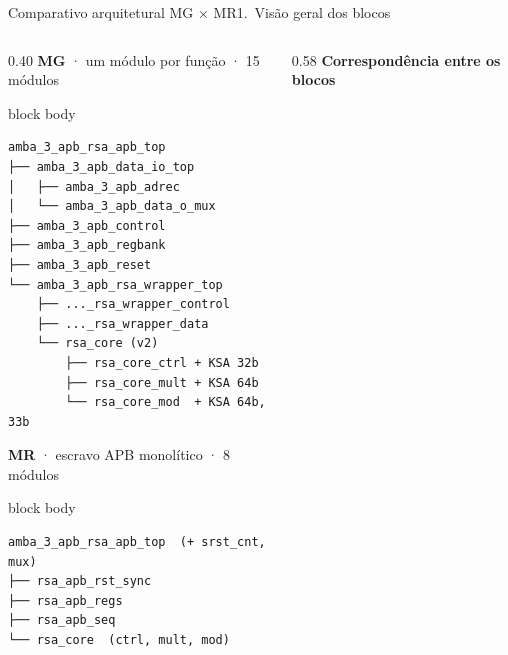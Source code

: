 \documentclass[aspectratio=169,10pt,t]{beamer}
\begin{document}
\begin{frame}[fragile]{Comparativo arquitetural MG × MR}{1.~Visão geral dos blocos}
  \vspace*{-0.35cm}
  \begin{columns}[T]
    \begin{column}{0.40\textwidth}
      {\scriptsize\textbf{\color{tmCafe}MG} · um módulo por função · 15 módulos}\\[0.05cm]
      \begin{beamercolorbox}[rounded=true,shadow=false,sep=3pt]{block body}
\vspace*{-0.6\baselineskip}
\fontsize{4.9}{5.7}\selectfont
\begin{verbatim}
amba_3_apb_rsa_apb_top
├── amba_3_apb_data_io_top
│   ├── amba_3_apb_adrec
│   └── amba_3_apb_data_o_mux
├── amba_3_apb_control
├── amba_3_apb_regbank
├── amba_3_apb_reset
└── amba_3_apb_rsa_wrapper_top
    ├── ..._rsa_wrapper_control
    ├── ..._rsa_wrapper_data
    └── rsa_core (v2)
        ├── rsa_core_ctrl + KSA 32b
        ├── rsa_core_mult + KSA 64b
        └── rsa_core_mod  + KSA 64b, 33b
\end{verbatim}
\vspace*{-0.6\baselineskip}
      \end{beamercolorbox}
      \vspace{0.1cm}
      {\scriptsize\textbf{\color{tmCafe}MR} · escravo APB monolítico · 8 módulos}\\[0.05cm]
      \begin{beamercolorbox}[rounded=true,shadow=false,sep=3pt]{block body}
\vspace*{-0.6\baselineskip}
\fontsize{4.9}{5.7}\selectfont
\begin{verbatim}
amba_3_apb_rsa_apb_top  (+ srst_cnt, mux)
├── rsa_apb_rst_sync
├── rsa_apb_regs
├── rsa_apb_seq
└── rsa_core  (ctrl, mult, mod)
\end{verbatim}
\vspace*{-0.6\baselineskip}
      \end{beamercolorbox}
    \end{column}
    \begin{column}{0.58\textwidth}
      {\scriptsize\textbf{\color{tmCafe}Correspondência entre os blocos}}\\[0.05cm]
      \tiny
      \renewcommand{\arraystretch}{1.05}

\end{column}
\end{columns}
\end{frame}
\end{document}
